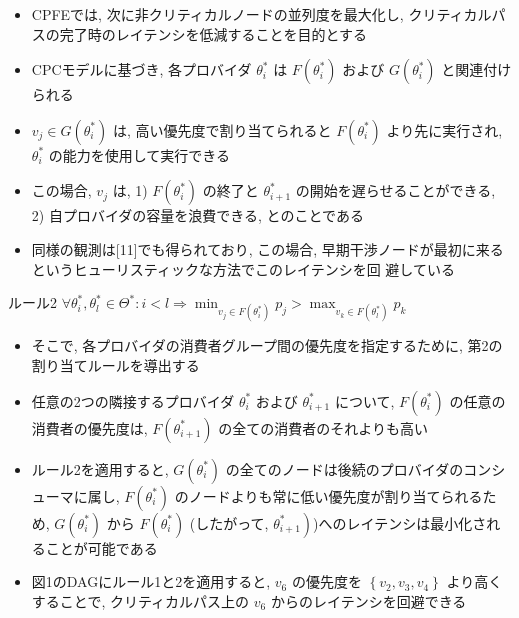 \begin{frame}{}
    \begin{itemize}
        \item CPFEでは, 次に非クリティカルノードの並列度を最大化し, クリティカルパスの完了時のレイテンシを低減することを目的とする
        \item CPCモデルに基づき, 各プロバイダ $\theta_{i}^{*}$ は $F\left(\theta_{i}^{*}\right)$ および $G\left(\theta_{i}^{*}\right)$ と関連付けられる
        \item $v_{j} \in G\left(\theta_{i}^{*}\right)$ は, 高い優先度で割り当てられると $F\left(\theta_{i}^{*}\right)$ より先に実行され, $\theta_{i}^{*}$ の能力を使用して実行できる
        \item この場合, $v_{j}$ は, 1)  $F\left(\theta_{i}^{*}\right)$ の終了と $\theta_{i+1}^{*}$ の開始を遅らせることができる, 2) 自プロバイダの容量を浪費できる, とのことである
        \item 同様の観測は[11]でも得られており, この場合, 早期干渉ノードが最初に来るというヒューリスティックな方法でこのレイテンシを回 避している
    \end{itemize}
\end{frame}

\begin{frame}{ルール2}
    $\forall \theta_{i}^{*}, \theta_{l}^{*} \in \Theta^{*}: i<l \Rightarrow \min _{v_{j} \in F\left(\theta_{i}^{*}\right)} p_{j}>\max _{v_{k} \in F\left(\theta_{l}^{*}\right)} p_{k}$
\end{frame}

\begin{frame}{}
    \begin{itemize}
        \item そこで, 各プロバイダの消費者グループ間の優先度を指定するために, 第2の割り当てルールを導出する
        \item 任意の2つの隣接するプロバイダ $\theta_{i}^{*}$ および $\theta_{i+1}^{*}$ について, $F\left(\theta_{i}^{*}\right)$ の任意の消費者の優先度は, $F\left(\theta_{i+1}^{*}\right)$ の全ての消費者のそれよりも高い
        \item ルール2を適用すると, $G\left(\theta_{i}^{*}\right)$ の全てのノードは後続のプロバイダのコンシューマに属し, $F\left(\theta_{i}^{*}\right)$ のノードよりも常に低い優先度が割り当てられるため, $G\left(\theta_{i}^{*}\right)$ から $F\left(\theta_{i}^{*}\right)$  (したがって, $\left.\theta_{i+1}^{*}\right)$)へのレイテンシは最小化されることが可能である
        \item 図1のDAGにルール1と2を適用すると, $v_{6}$ の優先度を $\left\{v_{2}, v_{3}, v_{4}\right\}$ より高くすることで, クリティカルパス上の $v_{6}$ からのレイテンシを回避できる
    \end{itemize}
\end{frame}

